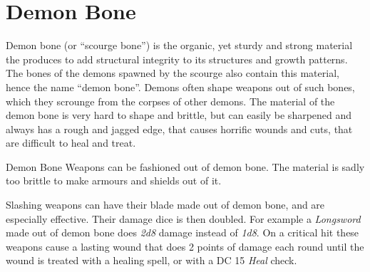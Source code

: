 \section{Demon Bone}
\label{sec:Demon Bone}

Demon bone (or ``scourge bone'') is the organic, yet sturdy and strong
material the  produces to add structural integrity to its
structures and growth patterns. The bones of the demons spawned by the scourge
also contain this material, hence the name ``demon bone''. Demons often shape
weapons out of such bones, which they scrounge from the corpses of other
demons. The material of the demon bone is very hard to shape and brittle, but
can easily be sharpened and always has a rough and jagged edge, that causes
horrific wounds and cuts, that are difficult to heal and treat.

\begin{35e}{Demon Bone}
  Weapons can be fashioned out of demon bone. The material is sadly too brittle
  to make armours and shields out of it.

  Slashing weapons can have their blade made out of demon bone, and are
  especially effective. Their damage dice is then doubled. For example a
  \emph{Longsword} made out of demon bone does \emph{2d8} damage instead of
  \emph{1d8}. On a critical hit these weapons cause a lasting wound that does
  2 points of damage each round until the wound is treated with a healing
  spell, or with a DC 15 \emph{Heal} check.
\end{35e}
